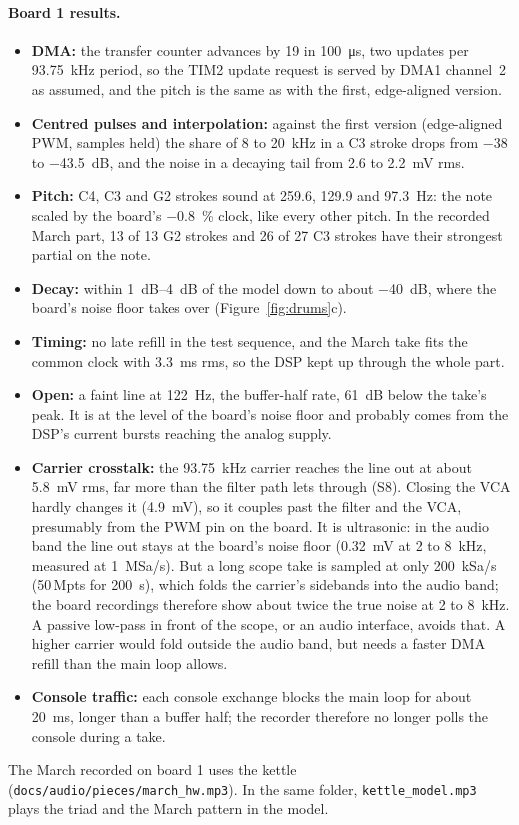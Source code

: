 \documentclass[11pt,a4paper]{article}
\newcommand{\file}[1]{\texttt{#1}}
\begin{document}
\paragraph{Board 1 results.}
\begin{itemize}
  \item \textbf{DMA:} the transfer counter advances by 19 in \SI{100}{\micro s}, two updates per
    \SI{93.75}{kHz} period, so the TIM2 update request is served by DMA1 channel~2 as assumed, and the pitch
    is the same as with the first, edge-aligned version.
  \item \textbf{Centred pulses and interpolation:} against the first version (edge-aligned PWM, samples held)
    the share of 8 to \SI{20}{kHz} in a C3 stroke drops from $-38$ to \SI{-43.5}{dB}, and the noise in a
    decaying tail from 2.6 to \SI{2.2}{mV} rms.
  \item \textbf{Pitch:} C4, C3 and G2 strokes sound at 259.6, 129.9 and \SI{97.3}{Hz}: the note scaled by the
    board's \SI{-0.8}{\percent} clock, like every other pitch. In the recorded March part, 13 of 13 G2 strokes
    and 26 of 27 C3 strokes have their strongest partial on the note.
  \item \textbf{Decay:} within \SIrange{1}{4}{dB} of the model down to about \SI{-40}{dB}, where the board's
    noise floor takes over (Figure~\ref{fig:drums}c).
  \item \textbf{Timing:} no late refill in the test sequence, and the March take fits the common clock with
    \SI{3.3}{ms} rms, so the DSP kept up through the whole part.
  \item \textbf{Open:} a faint line at \SI{122}{Hz}, the buffer-half rate, \SI{61}{dB} below the take's peak.
    It is at the level of the board's noise floor and probably comes from the DSP's current bursts reaching
    the analog supply.
  \item \textbf{Carrier crosstalk:} the \SI{93.75}{kHz} carrier reaches the line out at about \SI{5.8}{mV}
    rms, far more than the filter path lets through (S8). Closing the VCA hardly changes it (\SI{4.9}{mV}), so
    it couples past the filter and the VCA, presumably from the PWM pin on the board. It is ultrasonic: in the
    audio band the line out stays at the board's noise floor (\SI{0.32}{mV} at 2 to \SI{8}{kHz}, measured at
    \SI{1}{MSa/s}). But a long scope take is sampled at only \SI{200}{kSa/s} (50\,Mpts for \SI{200}{s}),
    which folds the carrier's sidebands into the audio band; the board recordings therefore show about twice
    the true noise at 2 to \SI{8}{kHz}. A passive low-pass in front of the scope, or an audio interface,
    avoids that. A higher carrier would fold outside the audio band, but needs a faster DMA refill than the
    main loop allows.
  \item \textbf{Console traffic:} each console exchange blocks the main loop for about \SI{20}{ms}, longer
    than a buffer half; the recorder therefore no longer polls the console during a take.
\end{itemize}
The March recorded on board 1 uses the kettle (\file{docs/audio/pieces/march\_hw.mp3}). In the same folder,
\file{kettle\_model.mp3} plays the triad and the March pattern in the model.
\end{document}
